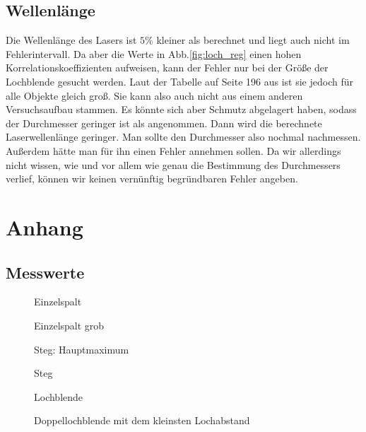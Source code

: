 \documentclass[12pt,a4paper,titlepage,headinclude,bibtotoc]{scrartcl}
\begin{document}
\subsection{Wellenlänge}
Die Wellenlänge des Lasers ist $5\%$ kleiner als berechnet und liegt auch nicht im Fehlerintervall.
Da aber die Werte in Abb.\ref{fig:loch_reg} einen hohen Korrelationskoeffizienten aufweisen, kann der Fehler nur bei der Größe der Lochblende gesucht werden.
Laut der Tabelle auf Seite 196 aus \cite{prakti} ist sie jedoch für alle Objekte gleich groß.
Sie kann also auch nicht aus einem anderen Versuchsaufbau stammen.
Es könnte sich aber Schmutz abgelagert haben, sodass der Durchmesser geringer ist als angenommen.
Dann wird die berechnete Laserwellenlänge geringer.
Man sollte den Durchmesser also nochmal nachmessen.
Außerdem hätte man für ihn einen Fehler annehmen sollen.
Da wir allerdings nicht wissen, wie und vor allem wie genau die Bestimmung des Durchmessers verlief, können wir keinen vernünftig begründbaren Fehler angeben.

\section{Anhang}
\subsection{Messwerte}
\begin{figure}[!htb]
	\centering
	
	\caption{Einzelspalt}
	\label{fig:spalt}
\end{figure}

\begin{figure}[!htb]
	\centering
	
	\caption{Einzelspalt grob}
\end{figure}

\begin{figure}[!htb]
	\centering
	
	\caption{Steg: Hauptmaximum}
\end{figure}

\begin{figure}[!htb]
	\centering
	
	\caption{Steg}
\end{figure}

\begin{figure}[!htb]
	\centering
	
	\caption{Lochblende}
\end{figure}

\begin{figure}[!htb]
	\centering
	
	\caption{Doppellochblende mit dem kleinsten Lochabstand}
\end{figure}
\end{document}
